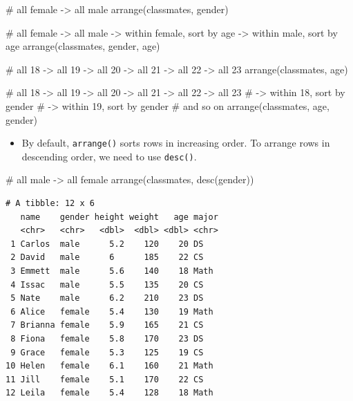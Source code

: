 \documentclass[
  letterpaper,
  DIV=11,
  numbers=noendperiod]{scrreprt}
\newenvironment{Shaded}{\begin{snugshade}}{\end{snugshade}}
\newcommand{\CommentTok}[1]{\textcolor[rgb]{0.37,0.37,0.37}{#1}}
\newcommand{\FunctionTok}[1]{\textcolor[rgb]{0.28,0.35,0.67}{#1}}
\newcommand{\NormalTok}[1]{\textcolor[rgb]{0.00,0.23,0.31}{#1}}
\providecommand{\tightlist}{%
  \setlength{\itemsep}{0pt}\setlength{\parskip}{0pt}}\usepackage{longtable,booktabs,array}
\begin{document}
\begin{Shaded}
\begin{Highlighting}[]
\CommentTok{\# all female {-}\textgreater{} all male}
\FunctionTok{arrange}\NormalTok{(classmates, gender)}

\CommentTok{\# all female {-}\textgreater{} all male {-}\textgreater{} within female, sort by age {-}\textgreater{} within male, sort by age}
\FunctionTok{arrange}\NormalTok{(classmates, gender, age)}

\CommentTok{\# all 18 {-}\textgreater{} all 19 {-}\textgreater{} all 20 {-}\textgreater{} all 21 {-}\textgreater{} all 22 {-}\textgreater{} all 23 }
\FunctionTok{arrange}\NormalTok{(classmates, age)}

\CommentTok{\# all 18 {-}\textgreater{} all 19 {-}\textgreater{} all 20 {-}\textgreater{} all 21 {-}\textgreater{} all 22 {-}\textgreater{} all 23 }
\CommentTok{\# {-}\textgreater{} within 18, sort by gender}
\CommentTok{\# {-}\textgreater{} within 19, sort by gender}
\CommentTok{\# and so on}
\FunctionTok{arrange}\NormalTok{(classmates, age, gender)}
\end{Highlighting}
\end{Shaded}

\begin{itemize}
\tightlist
\item
  By default, \texttt{arrange()} sorts rows in increasing order. To
  arrange rows in descending order, we need to use \texttt{desc()}.
\end{itemize}

\begin{Shaded}
\begin{Highlighting}[]
\CommentTok{\# all male {-}\textgreater{} all female}
\FunctionTok{arrange}\NormalTok{(classmates, }\FunctionTok{desc}\NormalTok{(gender))}
\end{Highlighting}
\end{Shaded}

\begin{verbatim}
# A tibble: 12 x 6
   name    gender height weight   age major
   <chr>   <chr>   <dbl>  <dbl> <dbl> <chr>
 1 Carlos  male      5.2    120    20 DS   
 2 David   male      6      185    22 CS   
 3 Emmett  male      5.6    140    18 Math 
 4 Issac   male      5.5    135    20 CS   
 5 Nate    male      6.2    210    23 DS   
 6 Alice   female    5.4    130    19 Math 
 7 Brianna female    5.9    165    21 CS   
 8 Fiona   female    5.8    170    23 DS   
 9 Grace   female    5.3    125    19 CS   
10 Helen   female    6.1    160    21 Math 
11 Jill    female    5.1    170    22 CS   
12 Leila   female    5.4    128    18 Math 
\end{verbatim}
\end{document}
